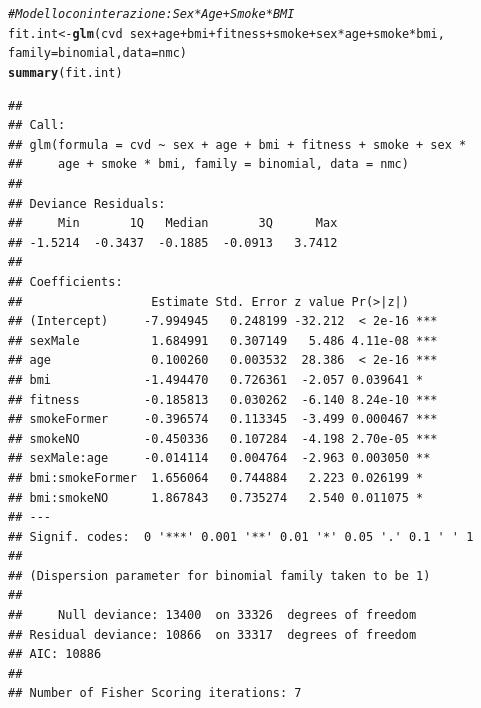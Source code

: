 \documentclass{article}\usepackage[]{graphicx}\usepackage[]{xcolor}
\makeatletter
\newcommand{\hlcom}[1]{\textcolor[rgb]{0.678,0.584,0.686}{\textit{#1}}}%
\newcommand{\hlopt}[1]{\textcolor[rgb]{0,0,0}{#1}}%
\newcommand{\hlstd}[1]{\textcolor[rgb]{0.345,0.345,0.345}{#1}}%
\newcommand{\hlkwb}[1]{\textcolor[rgb]{0.69,0.353,0.396}{#1}}%
\newcommand{\hlkwc}[1]{\textcolor[rgb]{0.333,0.667,0.333}{#1}}%
\newcommand{\hlkwd}[1]{\textcolor[rgb]{0.737,0.353,0.396}{\textbf{#1}}}%
\newenvironment{kframe}{%
 \def\at@end@of@kframe{}%
 \ifinner\ifhmode%
  \def\at@end@of@kframe{\end{minipage}}%
  \begin{minipage}{\columnwidth}%
 \fi\fi%
 \def\FrameCommand##1{\hskip\@totalleftmargin \hskip-\fboxsep
 \colorbox{shadecolor}{##1}\hskip-\fboxsep
     \hskip-\linewidth \hskip-\@totalleftmargin \hskip\columnwidth}%
 \MakeFramed {\advance\hsize-\width
   \@totalleftmargin\z@ \linewidth\hsize
   \@setminipage}}%
 {\par\unskip\endMakeFramed%
 \at@end@of@kframe}
\newenvironment{knitrout}{}{} %
\makeatother
\begin{document}
\begin{knitrout}
\color{fgcolor}\begin{kframe}
\begin{alltt}
\hlcom{#Modello con interazione: Sex*Age + Smoke*BMI}
\hlstd{fit.int} \hlkwb{<-} \hlkwd{glm}\hlstd{(cvd}\hlopt{~}\hlstd{sex}\hlopt{+}\hlstd{age}\hlopt{+}\hlstd{bmi}\hlopt{+}\hlstd{fitness}\hlopt{+}\hlstd{smoke}\hlopt{+}\hlstd{sex}\hlopt{*}\hlstd{age}\hlopt{+}\hlstd{smoke}\hlopt{*}\hlstd{bmi,}
               \hlkwc{family}\hlstd{=binomial,} \hlkwc{data}\hlstd{=nmc)}
\hlkwd{summary}\hlstd{(fit.int)}
\end{alltt}
\begin{verbatim}
## 
## Call:
## glm(formula = cvd ~ sex + age + bmi + fitness + smoke + sex * 
##     age + smoke * bmi, family = binomial, data = nmc)
## 
## Deviance Residuals: 
##     Min       1Q   Median       3Q      Max  
## -1.5214  -0.3437  -0.1885  -0.0913   3.7412  
## 
## Coefficients:
##                  Estimate Std. Error z value Pr(>|z|)    
## (Intercept)     -7.994945   0.248199 -32.212  < 2e-16 ***
## sexMale          1.684991   0.307149   5.486 4.11e-08 ***
## age              0.100260   0.003532  28.386  < 2e-16 ***
## bmi             -1.494470   0.726361  -2.057 0.039641 *  
## fitness         -0.185813   0.030262  -6.140 8.24e-10 ***
## smokeFormer     -0.396574   0.113345  -3.499 0.000467 ***
## smokeNO         -0.450336   0.107284  -4.198 2.70e-05 ***
## sexMale:age     -0.014114   0.004764  -2.963 0.003050 ** 
## bmi:smokeFormer  1.656064   0.744884   2.223 0.026199 *  
## bmi:smokeNO      1.867843   0.735274   2.540 0.011075 *  
## ---
## Signif. codes:  0 '***' 0.001 '**' 0.01 '*' 0.05 '.' 0.1 ' ' 1
## 
## (Dispersion parameter for binomial family taken to be 1)
## 
##     Null deviance: 13400  on 33326  degrees of freedom
## Residual deviance: 10866  on 33317  degrees of freedom
## AIC: 10886
## 
## Number of Fisher Scoring iterations: 7
\end{verbatim}
\end{kframe}
\end{knitrout}
\end{document}
